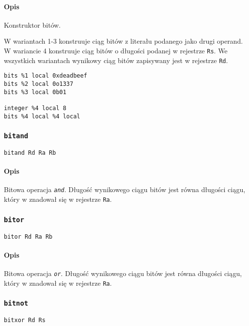 \paragraph*{Opis} Konstruktor bitów.

W wariantach 1-3 konstruuje ciąg bitów z literału podanego jako drugi operand.
W wariancie 4 konstruuje ciąg bitów o długości podanej w rejestrze \texttt{Rs}.
We wszystkich wariantach wynikowy ciąg bitów zapisywany jest w rejestrze
\texttt{Rd}.

\begin{lstlisting}
bits %1 local 0xdeadbeef
bits %2 local 0o1337
bits %3 local 0b01

integer %4 local 8
bits %4 local %4 local
\end{lstlisting}

\subsubsection{\texttt{bitand}}

\begin{lstlisting}
bitand Rd Ra Rb
\end{lstlisting}

\paragraph*{Opis} Bitowa operacja \emph{\texttt{and}}.
Długość wynikowego ciągu bitów jest równa długości ciągu, który w znadował się w
rejestrze \texttt{Ra}.

\subsubsection{\texttt{bitor}}

\begin{lstlisting}
bitor Rd Ra Rb
\end{lstlisting}

\paragraph*{Opis} Bitowa operacja \emph{\texttt{or}}.
Długość wynikowego ciągu bitów jest równa długości ciągu, który w znadował się w
rejestrze \texttt{Ra}.

\subsubsection{\texttt{bitnot}}

\begin{lstlisting}
bitxor Rd Rs
\end{lstlisting}

